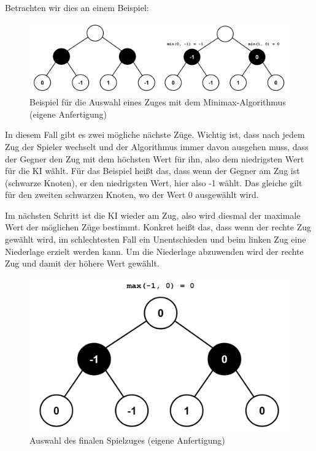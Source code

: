 Betrachten wir dies an einem Beispiel:
\begin{figure}[H]
    \centering
    \includegraphics[scale=0.4]{img/minimax_step_0.png}
    \caption[Beispiel für die Auswahl eines Zuges mit dem Minimax-Algorithmus]{Beispiel für die Auswahl eines Zuges mit dem Minimax-Algorithmus \\ (eigene Anfertigung)}
\end{figure}

In diesem Fall gibt es zwei mögliche nächste Züge. Wichtig ist, dass nach jedem Zug der Spieler wechselt und der Algorithmus 
immer davon ausgehen muss, dass der Gegner den Zug mit dem höchsten Wert für ihn, also dem niedrigsten Wert für die KI wählt. 
Für das Beispiel heißt das, dass wenn der Gegner am Zug ist (schwarze Knoten), er den niedrigsten Wert, hier also -1 wählt. 
Das gleiche gilt für den zweiten schwarzen Knoten, wo der Wert 0 ausgewählt wird.

Im nächsten Schritt ist die KI wieder am Zug, also wird diesmal der maximale Wert der möglichen Züge bestimmt. Konkret heißt das, 
dass wenn der rechte Zug gewählt wird, im schlechtesten Fall ein Unentschieden und beim linken Zug eine Niederlage erzielt werden kann. 
Um die Niederlage abzuwenden wird der rechte Zug und damit der höhere Wert gewählt.

\begin{figure}[H]
    \centering
    \includegraphics[scale=0.25]{img/minimax_step_1.png}
    \caption[Auswahl des finalen Spielzuges]{Auswahl des finalen Spielzuges (eigene Anfertigung)}
\end{figure}

